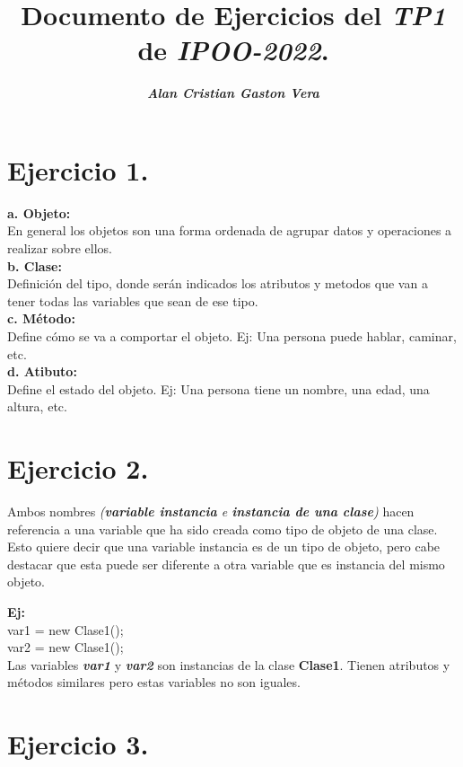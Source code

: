 \documentclass{article}
\title{Documento de Ejercicios del \textit{TP1} de \textit{IPOO-2022}.}
\author{\textbf{\textit{Alan Cristian Gaston Vera}}}
\date{}
\begin{document}
\maketitle
\section*{Ejercicio 1.}

\textbf{a. Objeto: }\\
\indent \indent \indent \indent En general los objetos son una forma ordenada de agrupar datos y operaciones a realizar sobre ellos.
\\
\textbf{b. Clase:}\\
\indent \indent \indent \indent Definición del tipo, donde serán indicados los atributos y metodos que van a tener todas las variables que sean de ese tipo.
\\
\textbf{c. Método:}\\
\indent \indent \indent \indent Define cómo se va a comportar el objeto. Ej: Una persona puede hablar, caminar, etc.
\\
\textbf{d. Atibuto:}\\
\indent \indent \indent \indent Define el estado del objeto. Ej: Una persona tiene un nombre, una edad, una altura, etc.

\section*{Ejercicio 2.}

\quad Ambos nombres \textit{(\textbf{variable instancia} e \textbf{instancia de una clase})} hacen
referencia a una variable que ha sido creada como tipo de objeto de una clase.
Esto quiere decir que una variable instancia es de un tipo de objeto, 
pero cabe destacar que esta puede ser diferente a otra variable que es instancia del mismo objeto. \par
\textbf{Ej: }\\
\indent var1 = new Clase1();\\ \indent var2 = new Clase1();\\
\indent Las variables \textit{\textbf{var1}} y \textit{\textbf{var2}} son instancias de la clase \textbf{Clase1}. Tienen atributos y métodos similares pero estas variables no son iguales.

\section*{Ejercicio 3.}
\end{document}

